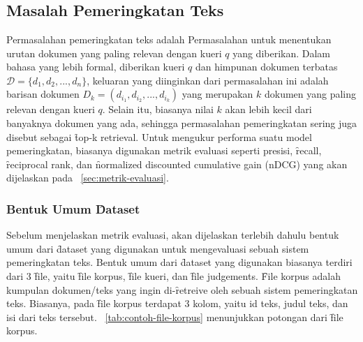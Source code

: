 \chapter{\babDua}
\label{bab:2}

\noindent{}



\section{Masalah Pemeringkatan Teks}

    Permasalahan pemeringkatan teks adalah Permasalahan untuk menentukan urutan dokumen yang paling relevan dengan kueri $q$ yang diberikan. Dalam bahasa yang lebih formal, diberikan kueri $q$ dan himpunan dokumen terbatas $\mathcal{D}= \{d_1, d_2, ..., d_n\}$, keluaran yang diinginkan dari permasalahan ini adalah barisan dokumen $D_k = (d_{i_1}, d_{i_2}, ..., d_{i_k})$ yang merupakan $k$ dokumen yang paling relevan dengan kueri $q$. Selain itu, biasanya nilai $k$ akan lebih kecil dari banyaknya dokumen yang ada, sehingga permasalahan pemeringkatan sering juga disebut sebagai \f{top-k retrieval}. Untuk mengukur performa suatu model pemeringkatan, biasanya digunakan metrik evaluasi seperti presisi, \f{recall}, \f{reciprocal rank}, dan \f{normalized discounted cumulative gain} (nDCG) yang akan dijelaskan pada \sect~\ref{sec:metrik-evaluasi}.

    \subsection{Bentuk Umum \f{Dataset}}
    \label{sec:dataset-umum}

    Sebelum menjelaskan metrik evaluasi, akan dijelaskan terlebih dahulu bentuk umum dari \f{dataset} yang digunakan untuk mengevaluasi sebuah sistem pemeringkatan teks. Bentuk umum dari \f{dataset} yang digunakan biasanya terdiri dari 3 \f{file}, yaitu \f{file} korpus, \f{file} kueri, dan \f{file judgements}. \f{File} korpus adalah kumpulan dokumen/teks yang ingin di-\f{retreive} oleh sebuah sistem pemeringkatan teks. Biasanya, pada \f{file} korpus terdapat 3 kolom, yaitu id teks, judul teks, dan isi dari teks tersebut. \tab~\ref{tab:contoh-file-korpus} menunjukkan potongan dari \f{file} korpus.

